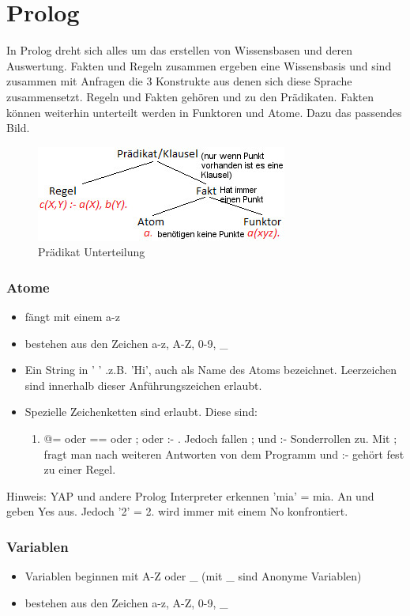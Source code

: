 \chapter{Prolog}
\label{sec:Prolog}
In Prolog dreht sich alles um das erstellen von Wissensbasen und deren Auswertung. Fakten und Regeln zusammen ergeben eine Wissensbasis und sind zusammen mit Anfragen die 3 Konstrukte aus denen sich diese Sprache zusammensetzt. Regeln und Fakten gehören und zu den Prädikaten. Fakten können weiterhin unterteilt werden in Funktoren und Atome. Dazu das passendes Bild. 

\begin{figure}[h]
\centering
\includegraphics[width=0.5\linewidth]{mainmatter/pics/Prolog}
\caption[Prädikat Unterteilung]{Prädikat Unterteilung}
\label{fig:Prolog}
\end{figure}

\subsection{Atome}
\begin{itemize}
	\item fängt mit einem a-z
	\item bestehen aus den Zeichen a-z, A-Z, 0-9, \_
	\item Ein String in ' ' .z.B. 'Hi', auch als Name des Atoms bezeichnet. Leerzeichen sind innerhalb dieser Anführungszeichen erlaubt.
	\item Spezielle Zeichenketten sind erlaubt. Diese sind:
	\begin{enumerate}
		\item @= oder == oder ; oder :-  . Jedoch fallen ; und :- Sonderrollen zu. Mit ; fragt man nach weiteren Antworten von dem Programm und :- gehört fest zu einer Regel.
	\end{enumerate}
\end{itemize}
Hinweis: YAP und andere Prolog Interpreter erkennen 'mia' = mia. An und geben Yes aus. Jedoch '2' = 2. wird immer mit einem No konfrontiert. 
\subsection{Variablen}
\begin{itemize}
	\item Variablen beginnen mit A-Z oder \_ (mit \_ sind Anonyme Variablen) 
	\item bestehen aus den Zeichen a-z, A-Z, 0-9, \_
\end{itemize}\newpage

